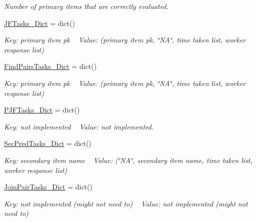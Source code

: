 \begin{DoxyCompactItemize}
\begin{DoxyCompactList}\small\item\em Number of primary items that are correctly evaluated. \end{DoxyCompactList}\item 
\mbox{\hyperlink{classjoinapp_1_1join__simulations_1_1_join_simulation_a571ec14fa93c479a08bd16214270405d}{J\+F\+Tasks\+\_\+\+Dict}} = dict()
\begin{DoxyCompactList}\small\item\em Key\+: primary item pk ~\newline
 Value\+: (primary item pk, \char`\"{}\+N\+A\char`\"{}, time taken list, worker response list) \end{DoxyCompactList}\item 
\mbox{\hyperlink{classjoinapp_1_1join__simulations_1_1_join_simulation_ad4d8fe10643a96959cbdd58a76ace647}{Find\+Pairs\+Tasks\+\_\+\+Dict}} = dict()
\begin{DoxyCompactList}\small\item\em Key\+: primary item pk ~\newline
 Value\+: (primary item pk, \char`\"{}\+N\+A\char`\"{}, time taken list, worker response list) \end{DoxyCompactList}\item 
\mbox{\hyperlink{classjoinapp_1_1join__simulations_1_1_join_simulation_acf745e74059b1d0391c59193f08cf849}{P\+J\+F\+Tasks\+\_\+\+Dict}} = dict()
\begin{DoxyCompactList}\small\item\em Key\+: not implemented ~\newline
 Value\+: not implemented. \end{DoxyCompactList}\item 
\mbox{\hyperlink{classjoinapp_1_1join__simulations_1_1_join_simulation_a66a9bd91d8e723d8ac29a56c73fa5b6d}{Sec\+Pred\+Tasks\+\_\+\+Dict}} = dict()
\begin{DoxyCompactList}\small\item\em Key\+: secondary item name ~\newline
 Value\+: (\char`\"{}\+N\+A\char`\"{}, secondary item name, time taken list, worker response list) \end{DoxyCompactList}\item 
\mbox{\hyperlink{classjoinapp_1_1join__simulations_1_1_join_simulation_aac74a0a6bd396765cc607a3362e7e334}{Join\+Pair\+Tasks\+\_\+\+Dict}} = dict()
\begin{DoxyCompactList}\small\item\em Key\+: not implemented (might not need to) ~\newline
 Value\+: not implemented (might not need to) \end{DoxyCompactList}\end{DoxyCompactItemize}


